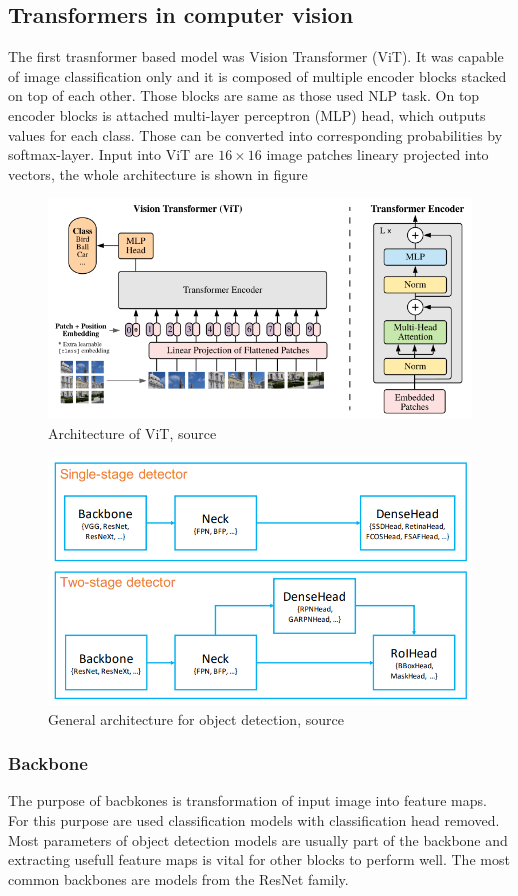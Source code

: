 \subsection{Transformers in computer vision}
The first trasnformer based model was Vision Transformer (ViT). It was capable of image classification only and it is composed of multiple encoder blocks stacked on top of each other. Those blocks are same as those used NLP task. On top encoder blocks is attached multi-layer perceptron (MLP) head, which outputs values for each class. Those can be converted into corresponding probabilities by softmax-layer. Input into ViT are $16 \times 16$ image patches lineary projected into vectors, the whole architecture is shown in figure
\begin{figure}
    \centering
    \includegraphics{images/vision_transformer.png}
    \caption{Architecture of ViT, source \cite{Dosovitskiy2020}}
    \label{fig:vision_transformer}
\end{figure}


\begin{figure}
    \centering
    \includegraphics[width=0.6\linewidth]{images/object_detection_architecture.png}
    \caption{General architecture for object detection, source \cite{Chen2019}}
    \label{fig:object_detection_architecture}
\end{figure}

\subsubsection{Backbone}
The purpose of bacbkones is transformation of input image into feature maps. For this purpose are used classification models with classification head removed. Most parameters of object detection models are usually part of the backbone and extracting usefull feature maps is vital for other blocks to perform well. The most common backbones are models from the ResNet family.

